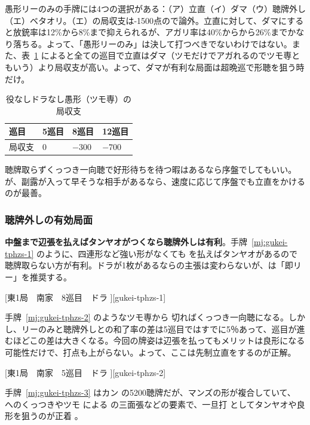\documentclass[../nankiru_main.tex]{subfiles}
\begin{document}
愚形リーのみの手牌には4つの選択がある：（ア）立直（イ）ダマ（ウ）聴牌外し（エ）ベタオリ。（エ）の局収支は-1500点ので論外\citep[][p. 30]{miinin-stat}。立直に対して、ダマにすると放銃率は12\%から8\%まで抑えられるが、アガリ率は40\%からから26\%までかなり落ちる。よって、「愚形リーのみ」は決して打つべきでないわけではない\citep{nisi-456kanchan}。また、表~\ref{tab:ev-tsumosen} によると全ての巡目で立直はダマ（ツモだけでアガれるのでツモ専ともいう）より局収支が高い。よって、ダマが有利な局面は超晩巡で形聴を狙う時だけ。

\begin{table}[ht]
  \centering
  \begin{tabular}{llll}
    巡目 & 5巡目 & 8巡目 & 12巡目 \\
    \hline
    局収支 & 0 & $-$300 & $-$700
  \end{tabular}
  \caption{役なしドラなし愚形（ツモ専）の局収支\citep[][p. 32]{horiuchi}}
  \label{tab:ev-tsumosen}
\end{table}

聴牌取らずくっつき一向聴で好形待ちを待つ暇はあるなら序盤でしてもいい。が、副露が入って早そうな相手があるなら、速度に応じて序盤でも立直をかけるのが最善\citep{nisi-456kanchan}。


\subsubsection*{聴牌外しの有効局面}

\textbf{中盤まで辺張を払えばタンヤオがつくなら聴牌外しは有利}\citep[][pp.~33--36]{miinin-stat}。手牌~\ref{mj:gukei-tphzs-1} のように、四連形など強い形がなくても  を払えばタンヤオがあるので聴牌取らない方が有利。ドラが1枚があるなら\citet[p. 35]{miinin-stat}の主張は変わらないが、\citet[p. 165]{rb1}は「即リー」を推奨する。

[東1局　南家　8巡目　ドラ ][gukei-tphzs-1]

手牌~\ref{mj:gukei-tphzs-2} のようなツモ専から  切ればくっつき一向聴になる。しかし、リーのみと聴牌外しとの和了率の差は5巡目ではすでに5％あって、巡目が進むほどこの差は大きくなる\citep[][p. 34]{miinin-stat}。今回の牌姿は辺張を払ってもメリットは良形になる可能性だけで、打点も上がらない。よって、ここは先制立直をするのが正解。

[東1局　南家　5巡目　ドラ ][gukei-tphzs-2]

手牌~\ref{mj:gukei-tphzs-3} はカン  の5200聴牌だが、マンズの形が複合していて、 へのくっつきやツモ  による  の三面張などの要素で、一旦打  としてタンヤオや良形を狙うのが正着 \citep[][pp.~161--162]{ooi-gundou}。
\end{document}
